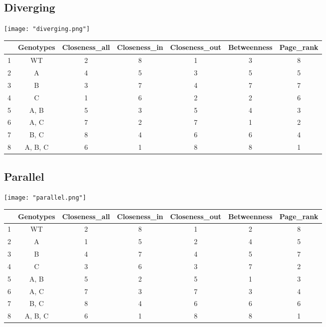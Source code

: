 \documentclass[12pt, a4paper]{article}
\begin{document}
\pagebreak
\subsection{Diverging}
\begin{center}
  \texttt{[image: "diverging.png"]}
\end{center}

\begin{table}[ht]
  \centering
  \begin{tabular}{c|c|ccccc}
    \toprule
   & Genotypes & Closeness\_all & Closeness\_in & Closeness\_out & Betweenness & Page\_rank \\ 
    \midrule
  1 & WT &   2 &   8 &   1 &   3 &   8 \\ 
     \rowcolor[gray]{0.95}2 & A &   4 &   5 &   3 &   5 &   5 \\ 
    3 & B &   3 &   7 &   4 &   7 &   7 \\ 
     \rowcolor[gray]{0.95}4 & C &   1 &   6 &   2 &   2 &   6 \\ 
    5 & A, B &   5 &   3 &   5 &   4 &   3 \\ 
     \rowcolor[gray]{0.95}6 & A, C &   7 &   2 &   7 &   1 &   2 \\ 
    7 & B, C &   8 &   4 &   6 &   6 &   4 \\ 
     \rowcolor[gray]{0.95}8 & A, B, C &   6 &   1 &   8 &   8 &   1 \\ 
     \bottomrule
  \end{tabular}
  \end{table}

\pagebreak  
\subsection{Parallel}
\begin{center}
  \texttt{[image: "parallel.png"]}
\end{center}
\begin{table}[ht]
  \centering
  \begin{tabular}{c|c|ccccc}
    \toprule
   & Genotypes & Closeness\_all & Closeness\_in & Closeness\_out & Betweenness & Page\_rank \\ 
    \midrule
  1 & WT &   2 &   8 &   1 &   2 &   8 \\ 
     \rowcolor[gray]{0.95}2 & A &   1 &   5 &   2 &   4 &   5 \\ 
    3 & B &   4 &   7 &   4 &   5 &   7 \\ 
     \rowcolor[gray]{0.95}4 & C &   3 &   6 &   3 &   7 &   2 \\ 
    5 & A, B &   5 &   2 &   5 &   1 &   3 \\ 
     \rowcolor[gray]{0.95}6 & A, C &   7 &   3 &   7 &   3 &   4 \\ 
    7 & B, C &   8 &   4 &   6 &   6 &   6 \\ 
     \rowcolor[gray]{0.95}8 & A, B, C &   6 &   1 &   8 &   8 &   1 \\ 
     \bottomrule
  \end{tabular}
  \end{table}
    
\end{document}
